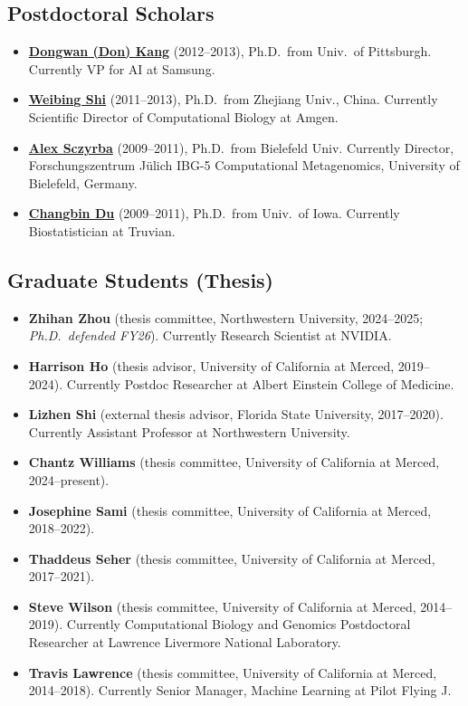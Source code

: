 \documentclass[11pt,letterpaper]{article}
\newenvironment{cvlist}
  {\begin{itemize}[leftmargin=1.4em, label=\textcolor{accent2}{\small$\bullet$},
    itemsep=2.5pt, topsep=2pt, parsep=0pt]}
  {\end{itemize}}
\begin{document}
\subsection{Postdoctoral Scholars}
\begin{cvlist}
  \item \href{https://www.linkedin.com/in/don-kang-8246901a/}{\textbf{Dongwan (Don) Kang}} (2012--2013), Ph.D.\ from Univ.\ of Pittsburgh. Currently VP for AI at Samsung.
  \item \href{https://www.linkedin.com/in/weibing-shi-38218452/}{\textbf{Weibing Shi}} (2011--2013), Ph.D.\ from Zhejiang Univ., China. Currently Scientific Director of Computational Biology at Amgen.
  \item \href{https://www.linkedin.com/in/asczyrba/}{\textbf{Alex Sczyrba}} (2009--2011), Ph.D.\ from Bielefeld Univ. Currently Director, Forschungszentrum J\"ulich IBG-5 Computational Metagenomics, University of Bielefeld, Germany.
  \item \href{https://www.linkedin.com/in/changbin-du-b78b0418/}{\textbf{Changbin Du}} (2009--2011), Ph.D.\ from Univ.\ of Iowa. Currently Biostatistician at Truvian.
\end{cvlist}

\subsection{Graduate Students (Thesis)}
\begin{cvlist}
  \item \textbf{Zhihan Zhou} (thesis committee, Northwestern University, 2024--2025; \emph{Ph.D.\ defended FY26}). Currently Research Scientist at NVIDIA.
  \item \textbf{Harrison Ho} (thesis advisor, University of California at Merced, 2019--2024). Currently Postdoc Researcher at Albert Einstein College of Medicine.
  \item \textbf{Lizhen Shi} (external thesis advisor, Florida State University, 2017--2020). Currently Assistant Professor at Northwestern University.
  \item \textbf{Chantz Williams} (thesis committee, University of California at Merced, 2024--present).
  \item \textbf{Josephine Sami} (thesis committee, University of California at Merced, 2018--2022).
  \item \textbf{Thaddeus Seher} (thesis committee, University of California at Merced, 2017--2021).
  \item \textbf{Steve Wilson} (thesis committee, University of California at Merced, 2014--2019). Currently Computational Biology and Genomics Postdoctoral Researcher at Lawrence Livermore National Laboratory.
  \item \textbf{Travis Lawrence} (thesis committee, University of California at Merced, 2014--2018). Currently Senior Manager, Machine Learning at Pilot Flying J.
\end{cvlist}
\end{document}
